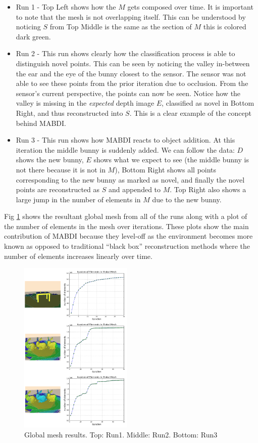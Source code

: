 \begin{itemize}
  \item Run 1 - Top Left shows how the $M$ gets composed over time.
  It is important to note that the mesh is not overlapping itself. This can be
  understood by noticing $S$ from Top Middle is the same as
  the section of $M$ this is colored dark green.
  \item Run 2 - This run shows clearly how the classification process is able to
  distinguish novel points. This can be seen by noticing the valley in-between
  the ear and the eye of the bunny closest to the sensor. The sensor was not
  able to see these points from the prior iteration due to occlusion. From the
  sensor's current perspective, the points can now be seen. Notice how the
  valley is missing in the \emph{expected} depth image $E$, classified as novel
  in Bottom Right, and thus reconstructed into $S$. This is a clear example of
  the concept behind MABDI.
  \item Run 3 - This run shows how MABDI reacts to object addition. At this
  iteration the middle bunny is suddenly added. We can follow the data: $D$
  shows the new bunny, $E$ shows what we expect to see (the middle bunny is not
  there because it is not in $M$), Bottom Right shows all points corresponding
  to the new bunny as marked as novel, and finally the novel points are
  reconstructed as $S$ and appended to $M$. Top Right also shows a large jump in
  the number of elements in $M$ due to the new bunny.
\end{itemize}

Fig \ref{fig:gm} shows the resultant global mesh from all of the runs along with a plot of the number of elements in the mesh over iterations. These plots show the main contribution of MABDI because they level-off as the environment becomes more known as opposed to traditional ``black box'' reconstruction methods where the number of elements increases linearly over time.

\begin{figure}[h]%
\centering
\includegraphics[width=0.48\textwidth]{figures/diagram_run123_gm.png}
\caption{Global mesh results. Top: Run1. Middle: Run2. Bottom: Run3}
\label{fig:gm}
\end{figure}
